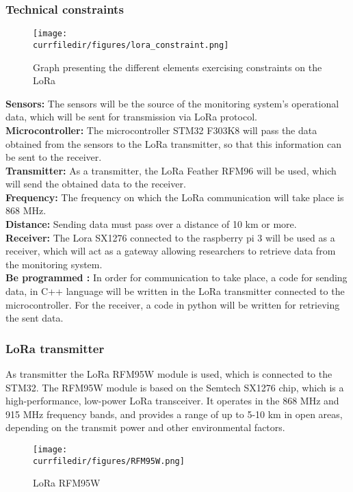 \newpage
\subsubsection{Technical constraints}
\begin{figure}[!h]
    \centering
    \texttt{[image: \\currfiledir/figures/lora\_constraint.png]}
    \caption{Graph presenting the different elements exercising constraints on the LoRa}
\end{figure}

\noindent\textbf{Sensors:} The sensors will be the source of the monitoring system's operational data, which will be sent for transmission via LoRa protocol.\\

\noindent\textbf{Microcontroller:} The microcontroller STM32 F303K8 will pass the data obtained from the sensors to the LoRa transmitter, so that this information can be sent to the receiver.\\

\noindent\textbf{Transmitter:} As a transmitter, the LoRa Feather RFM96 will be used, which will send the obtained data to the receiver.\\

\noindent\textbf{Frequency:} The frequency on which the LoRa communication will take place is 868 MHz.\\

\noindent\textbf{Distance:} Sending data must pass over a distance of 10 km or more.\\

\noindent\textbf{Receiver:} The Lora SX1276 connected to the raspberry pi 3 will be used as a receiver, which will act as a gateway allowing researchers to retrieve data from the monitoring system.\\

\noindent\textbf{Be programmed :}  In order for communication to take place, a code for sending data, in C++ language will be written in the LoRa transmitter connected to the microcontroller. For the receiver, a code in python will be written for retrieving the sent data.

\subsubsection{LoRa transmitter}
As transmitter the LoRa RFM95W module is used, which is connected to the STM32. The RFM95W module is based on the Semtech SX1276 chip, which is a high-performance, low-power LoRa transceiver. It operates in the 868 MHz and 915 MHz frequency bands, and provides a range of up to 5-10 km in open areas, depending on the transmit power and other environmental factors.
\begin{figure}[!h]
    \centering
    \texttt{[image: \\currfiledir/figures/RFM95W.png]}
    \caption{LoRa RFM95W}
    \cite{RFM95W}
\end{figure}

